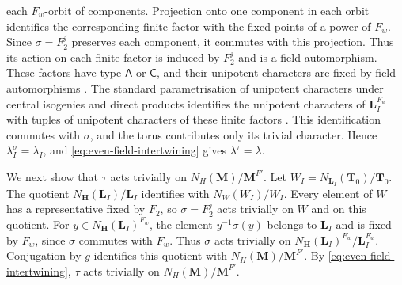 \documentclass[10pt]{amsart}
\theoremstyle{definition}
\let\oldendproof\endproof
\renewenvironment{proof}[1][\proofname]{%
  \oldproof[\bfseries #1]%
}{\oldendproof}
\numberwithin{equation}{section}
\numberwithin{table}{section}
\begin{document}
\begin{proof}
each $F_w$-orbit of components.
Projection onto one component in each orbit identifies the corresponding
finite factor with the fixed points of a power of $F_w$.
Since $\sigma=F_2^j$ preserves each component, it commutes with this
projection. Thus its action on each finite factor is induced by
$F_2^j$ and is a field automorphism.
These factors have type $\mathsf A$ or $\mathsf C$, and their unipotent
characters are fixed by field automorphisms
\cite[p.~700]{CabanesSpath2013}.
The standard parametrisation of unipotent characters under central isogenies
and direct products identifies the unipotent characters of $\mathbf L_I^{F_w}$
with tuples of unipotent characters of these finite factors
\cite[Remark~4.2.1]{GeckMalle2020}.
This identification commutes with $\sigma$, and the torus
contributes only its trivial character.
Hence $\lambda_I^\sigma=\lambda_I$, and
\eqref{eq:even-field-intertwining} gives $\lambda^\tau=\lambda$.

  We next show that $\tau$ acts trivially on
  $N_H(\mathbf M)/\mathbf M^{F'}$.
  Let $W_I=N_{\mathbf L_I}(\mathbf T_0)/\mathbf T_0$.  The quotient
  $N_{\mathbf H}(\mathbf L_I)/\mathbf L_I$ identifies with
  $N_W(W_I)/W_I$.  Every element of $W$ has a representative fixed by
  $F_2$, so $\sigma=F_2^j$ acts trivially on $W$ and on this quotient.
  For $y\in N_{\mathbf H}(\mathbf L_I)^{F_w}$, the element
  $y^{-1}\sigma(y)$ belongs to $\mathbf L_I$ and is fixed by $F_w$,
  since $\sigma$ commutes with $F_w$.  Thus $\sigma$ acts trivially on
  $N_{\mathbf H}(\mathbf L_I)^{F_w}/\mathbf L_I^{F_w}$.
  Conjugation by $g$ identifies this quotient with
  $N_H(\mathbf M)/\mathbf M^{F'}$. By \eqref{eq:even-field-intertwining},
  $\tau$ acts trivially on $N_H(\mathbf M)/\mathbf M^{F'}$.


\end{proof}
\end{document}
